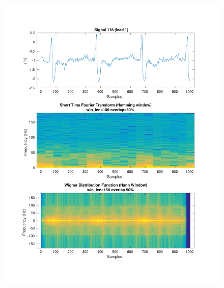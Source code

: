 \documentclass[11pt,a4paper]{article}
\begin{document}
\begin{figure}[H]
\centering
\begin{minipage}{0.48\textwidth}
	\centering
	\includegraphics[width=\textwidth]{fig/118l1_stft_wdf.pdf}
\end{minipage}
\begin{minipage}{0.48\textwidth}
	\centering

\end{minipage}
\end{figure}
\end{document}
